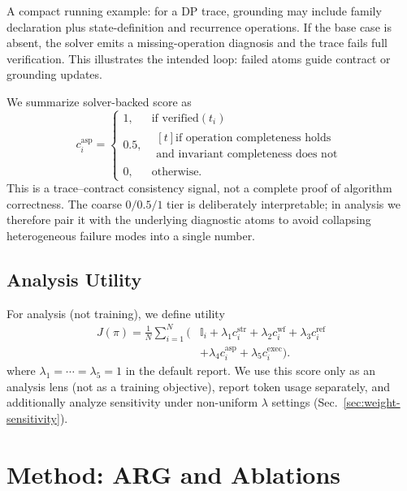 \documentclass{article}
\begin{document}
A compact running example: for a DP trace, grounding may include family declaration plus state-definition and recurrence operations. If the base case is absent, the solver emits a missing-operation diagnosis and the trace fails full verification. This illustrates the intended loop: failed atoms guide contract or grounding updates.

We summarize solver-backed score as
\begin{equation}
\label{eq:casp}
c_i^{\text{asp}}=
\begin{cases}
1, & \text{if } \mathrm{verified}(t_i) \\
0.5, & \begin{aligned}[t]
\text{if operation completeness holds}\\
\text{and invariant completeness does not}
\end{aligned} \\
0, & \text{otherwise.}
\end{cases}
\end{equation}
This is a trace--contract consistency signal, not a complete proof of algorithm correctness. The coarse \(0/0.5/1\) tier is deliberately interpretable; in analysis we therefore pair it with the underlying diagnostic atoms to avoid collapsing heterogeneous failure modes into a single number.

\subsection{Analysis Utility}
For analysis (not training), we define utility
\begin{equation}
\label{eq:objective}
\begin{aligned}
J(\pi)=\frac{1}{N}\sum_{i=1}^{N}\Big(&\mathbb{I}_i+\lambda_1c_i^{\text{str}}+\lambda_2 c_i^{\text{wf}}+\lambda_3 c_i^{\text{ref}} \\
&+\lambda_4 c_i^{\text{asp}}+\lambda_5 c_i^{\text{exec}}\Big).
\end{aligned}
\end{equation}
where \(\lambda_1=\cdots=\lambda_5=1\) in the default report. We use this score only as an analysis lens (not as a training objective), report token usage separately, and additionally analyze sensitivity under non-uniform \(\lambda\) settings (Sec.~\ref{sec:weight-sensitivity}).

\section{Method: ARG and Ablations}
\end{document}

